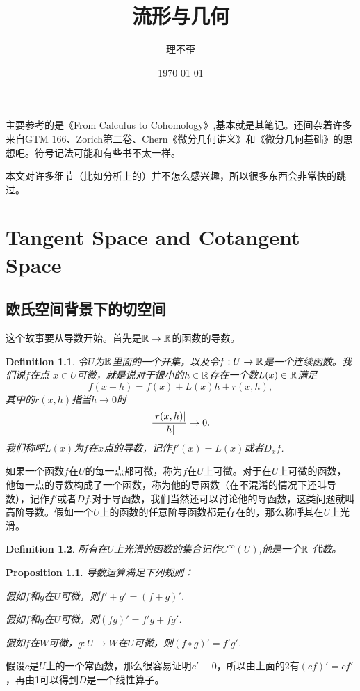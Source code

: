 \documentclass[11pt]{extbook}
\theoremstyle{plain}%
\newtheorem{pro}{Proposition}[section]%
\newtheorem{defi}{Definition}[section]%
\begin{document}
\title{流形与几何}
\author{理不歪}
\date{\today}
\maketitle %
\clearpage
主要参考的是《From Calculus to Cohomology》,基本就是其笔记。还间杂着许多来自GTM 166、Zorich第二卷、Chern《微分几何讲义》和《微分几何基础》的思想吧。符号记法可能和有些书不太一样。

本文对许多细节（比如分析上的）并不怎么感兴趣，所以很多东西会非常快的跳过。
\clearpage
\chapter{Tangent Space and Cotangent Space}
\section{欧氏空间背景下的切空间}
这个故事要从导数开始。首先是$\mathbb{R}\to \mathbb{R}$的函数的导数。
\begin{defi}
	令$U$为$\mathbb{R}$里面的一个开集，以及令$f:U\rightarrow \mathbb{R}$是一个连续函数。我们说$f$在点 $x \in U$可微，就是说对于很小的$h \in \mathbb{R}$存在一个数$L(x)\in \mathbb{R}$满足
	\begin{equation}
		f(x+h)=f(x)+L(x)h+r(x,h),
	\end{equation}
	其中的$r(x,h)$指当$h\to 0$时
	\begin{equation}
		\frac{\arrowvert r(x,h) \arrowvert}{\arrowvert h \arrowvert} \to 0.
	\end{equation}
	我们称呼$L(x)$为$f$在$x$点的导数，记作$f'(x)=L(x)$或者$D_xf$.
\end{defi}
如果一个函数$f$在$U$的每一点都可微，称为$f$在$U$上可微。对于在$U$上可微的函数，他每一点的导数构成了一个函数，称为他的导函数（在不混淆的情况下还叫导数），记作$f'$或者$Df$.对于导函数，我们当然还可以讨论他的导函数，这类问题就叫高阶导数。假如一个$U$上的函数的任意阶导函数都是存在的，那么称呼其在$U$上光滑。
\begin{defi}
	所有在$U$上光滑的函数的集合记作$C^\infty(U)$,他是一个$\mathbb{R}$-代数。
\end{defi}
\begin{pro}
	导数运算满足下列规则：
	
	假如$f$和$g$在$U$可微，则$f'+g'=(f+g)'$.
	
	假如$f$和$g$在$U$可微，则$(fg)'=f'g+fg'$.
	
	假如$f$在$W$可微，$g:U\to W$在$U$可微，则$(f\circ g)'=f'g'$.
\end{pro}
假设$c$是$U$上的一个常函数，那么很容易证明$c'\equiv 0$，所以由上面的2有$(cf)'=cf'$，再由1可以得到$D$是一个线性算子。
\end{document}

